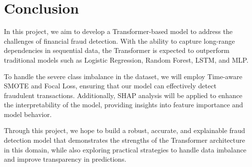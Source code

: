 \documentclass[11pt, oneside]{article}   	%
\begin{document}
\section{Conclusion}

In this project, we aim to develop a Transformer-based model to address the challenges of financial fraud detection. With the ability to capture long-range dependencies in sequential data, the Transformer is expected to outperform traditional models such as Logistic Regression, Random Forest, LSTM, and MLP. 

To handle the severe class imbalance in the dataset, we will employ Time-aware SMOTE and Focal Loss, ensuring that our model can effectively detect fraudulent transactions. Additionally, SHAP analysis will be applied to enhance the interpretability of the model, providing insights into feature importance and model behavior.

Through this project, we hope to build a robust, accurate, and explainable fraud detection model that demonstrates the strengths of the Transformer architecture in this domain, while also exploring practical strategies to handle data imbalance and improve transparency in predictions.




\end{document}
